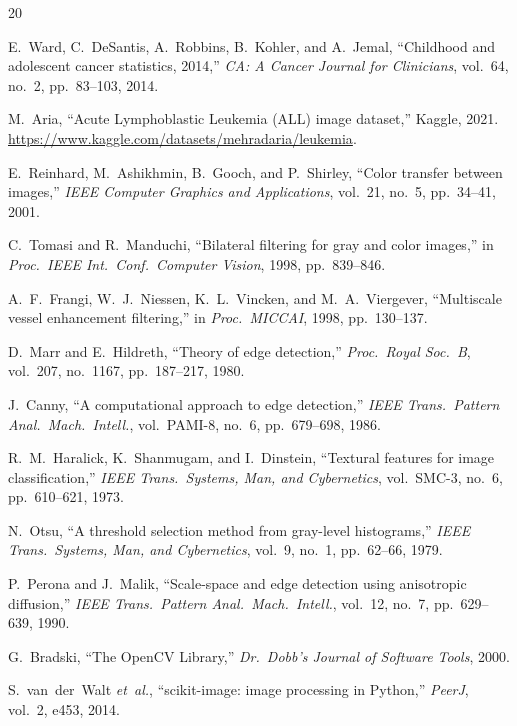 \documentclass[conference,10pt]{IEEEtran}
\begin{document}
\begin{thebibliography}{20}

E.~Ward, C.~DeSantis, A.~Robbins, B.~Kohler, and A.~Jemal,
``Childhood and adolescent cancer statistics, 2014,''
\emph{CA: A Cancer Journal for Clinicians}, vol.~64, no.~2, pp.~83--103, 2014.

M.~Aria, ``Acute Lymphoblastic Leukemia (ALL) image dataset,''
Kaggle, 2021.
\url{https://www.kaggle.com/datasets/mehradaria/leukemia}.

E.~Reinhard, M.~Ashikhmin, B.~Gooch, and P.~Shirley,
``Color transfer between images,''
\emph{IEEE Computer Graphics and Applications}, vol.~21, no.~5, pp.~34--41, 2001.

C.~Tomasi and R.~Manduchi,
``Bilateral filtering for gray and color images,''
in \emph{Proc.\ IEEE Int.\ Conf.\ Computer Vision}, 1998, pp.~839--846.

A.~F.~Frangi, W.~J.~Niessen, K.~L.~Vincken, and M.~A.~Viergever,
``Multiscale vessel enhancement filtering,''
in \emph{Proc.\ MICCAI}, 1998, pp.~130--137.

D.~Marr and E.~Hildreth,
``Theory of edge detection,''
\emph{Proc.\ Royal Soc.\ B}, vol.~207, no.~1167, pp.~187--217, 1980.

J.~Canny,
``A computational approach to edge detection,''
\emph{IEEE Trans.\ Pattern Anal.\ Mach.\ Intell.}, vol.~PAMI-8, no.~6, pp.~679--698, 1986.

R.~M.~Haralick, K.~Shanmugam, and I.~Dinstein,
``Textural features for image classification,''
\emph{IEEE Trans.\ Systems, Man, and Cybernetics}, vol.~SMC-3, no.~6, pp.~610--621, 1973.

N.~Otsu,
``A threshold selection method from gray-level histograms,''
\emph{IEEE Trans.\ Systems, Man, and Cybernetics}, vol.~9, no.~1, pp.~62--66, 1979.

P.~Perona and J.~Malik,
``Scale-space and edge detection using anisotropic diffusion,''
\emph{IEEE Trans.\ Pattern Anal.\ Mach.\ Intell.}, vol.~12, no.~7, pp.~629--639, 1990.

G.~Bradski, ``The OpenCV Library,''
\emph{Dr.\ Dobb's Journal of Software Tools}, 2000.

S.~van~der~Walt \emph{et~al.},
``scikit-image: image processing in Python,''
\emph{PeerJ}, vol.~2, e453, 2014.

\end{thebibliography}
\end{document}
